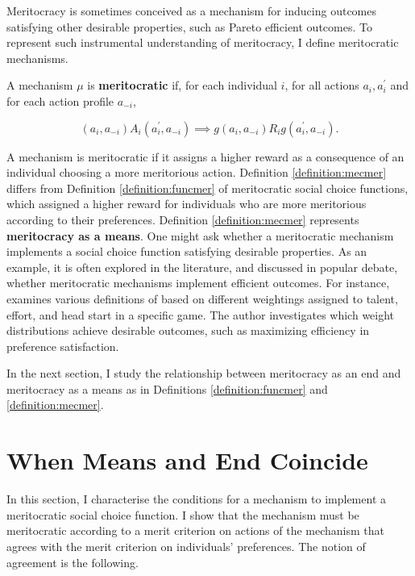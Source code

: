 Meritocracy is sometimes conceived as a mechanism for inducing outcomes satisfying other desirable properties, such as Pareto efficient outcomes. To represent such instrumental understanding of meritocracy, I define meritocratic mechanisms.

\begin{definition}\label{definition:mecmer}
	A mechanism \( \mu \) is \textbf{meritocratic} if, for each individual \( i \), for all actions \( a_i, a_i^{\prime} \) and for each action profile \( a_{-i} \),

	\[ ( a_i, a_{-i} ) A_i ( a^{\prime}_i, a_{-i} ) \implies g ( a_i, a_{-i} ) R_i g ( a^{\prime}_i, a_{-i} ) .\]
\end{definition}

A mechanism is meritocratic if it assigns a higher reward as a consequence of an individual choosing a more meritorious action. Definition \ref{definition:mecmer} differs from Definition \ref{definition:funcmer} of meritocratic social choice functions, which assigned a higher reward for individuals who are more meritorious according to their preferences. Definition \ref{definition:mecmer} represents \textbf{meritocracy as a means}. One might ask whether a meritocratic mechanism implements a social choice function satisfying desirable properties. As an example, it is often explored in the literature, and discussed in popular debate, whether meritocratic mechanisms implement efficient outcomes. For instance, \cite{moisson2024meritocracy} examines various definitions of  based on different weightings assigned to talent, effort, and head start in a specific game. The author investigates which weight distributions achieve desirable outcomes, such as maximizing efficiency in preference satisfaction.

In the next section, I study the relationship between meritocracy as an end and meritocracy as a means as in Definitions \ref{definition:funcmer} and \ref{definition:mecmer}.

\section{When Means and End Coincide}\label{sec:agree}

In this section, I characterise the conditions for a mechanism to implement a meritocratic social choice function. I show that the mechanism must be meritocratic according to a merit criterion on actions of the mechanism that agrees with the merit criterion on individuals' preferences. The notion of agreement is the following.

